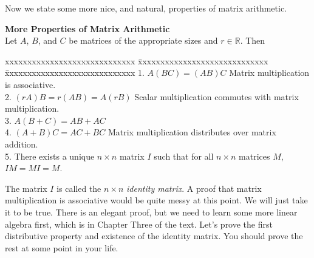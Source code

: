 \documentclass[12pt]{article}
\def\R{\mathbb{R}} \def\Q{\mathbb{Q}} \def\N{\mathbb{N}} \def\Z{\mathbb{Z}} \def\P{\mathbb{P}}
\def\bttt{\begin{tabbing}
xxxxxxxxxxxxxxxxxxxxxxxxxxxxx \=
xxxxxxxxxxxxxxxxxxxxxxxxxxxxx \=
xxxxxxxxxxxxxxxxxxxxxxxxxxxxx \kill}
\def\etb{\end{tabbing}}
\begin{document}
Now we state some more nice, and natural, properties of matrix arithmetic. \\
\begin{framed}
{\bf More Properties of Matrix Arithmetic} \\
Let $A$, $B$, and $C$ be matrices of the appropriate sizes and $r \in \R$. Then
\bttt
1. $A(BC) = (AB)C$ \> Matrix multiplication is associative. \> \\[.05in]
2. $(rA)B = r(AB) = A(rB)$ \> Scalar multiplication commutes with matrix multiplication.  \> \\[.05in]
3. $A(B + C) = AB + AC$ \> \ \> \\[.05in]
4. $(A + B)C = AC + BC$ \> Matrix multiplication distributes over matrix addition. \> \\[.05in]
5. There exists a unique $n \times n$ matrix $I$ such that for all $n \times n$ matrices $M$, $I M = M I = M$. \> \ \> 
\etb
\end{framed}
The matrix $I$ is called the $n \times n$ {\itshape identity matrix}. A proof that matrix multiplication is associative would be quite messy at this point. We will just take it to be true. There is an elegant proof, but we need to learn some more linear algebra first, which is in Chapter Three of the text. Let's prove the first distributive property and existence of the identity matrix. You should prove the rest at some point in your life.
\end{document}
